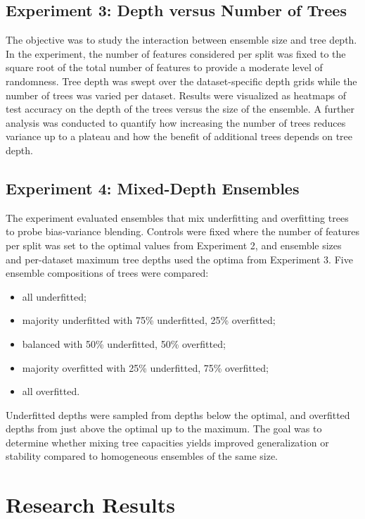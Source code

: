\documentclass[conference]{IEEEtran}
\begin{document}
\subsection{Experiment 3: Depth versus Number of Trees}
The objective was to study the interaction between ensemble size and tree depth. In the experiment, the number of features considered per split was fixed to the square root of the total number of features to provide a moderate level of randomness. Tree depth was swept over the dataset-specific depth grids while the number of
 trees was varied per dataset. Results were visualized as heatmaps of test accuracy on the depth of the trees versus the size of the ensemble. A further analysis was conducted to quantify how increasing the number of trees reduces variance up to a plateau and how the benefit of additional trees depends on tree depth.

\subsection{Experiment 4: Mixed-Depth Ensembles}
The experiment evaluated ensembles that mix underfitting and overfitting trees to probe bias-variance blending. Controls were fixed where the number of features per split was set to the optimal values from Experiment 2, and ensemble sizes and per-dataset maximum tree depths used the optima from Experiment 3.
Five ensemble compositions of trees were compared:
\begin{itemize}
  \item all underfitted;
  \item majority underfitted with 75\% underfitted, 25\% overfitted;
  \item balanced with 50\% underfitted, 50\% overfitted;
  \item majority overfitted with 25\% underfitted, 75\% overfitted;
  \item all overfitted. 
\end{itemize}
Underfitted depths were sampled from depths below the optimal, and overfitted depths from just above the optimal up to the maximum. The goal was to determine whether mixing tree capacities yields improved generalization or stability compared to homogeneous ensembles of the same size.



\section{Research Results}
\end{document}
